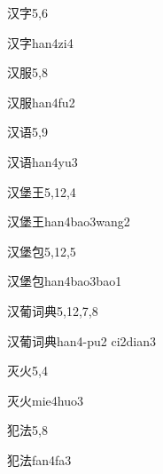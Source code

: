 \begin{entry}{汉字}{5,6}
  \begin{phonetics}{汉字}{han4zi4}
  \end{phonetics}
\end{entry}

\begin{entry}{汉服}{5,8}
  \begin{phonetics}{汉服}{han4fu2}
  \end{phonetics}
\end{entry}

\begin{entry}{汉语}{5,9}
  \begin{phonetics}{汉语}{han4yu3}
  \end{phonetics}
\end{entry}

\begin{entry}{汉堡王}{5,12,4}
  \begin{phonetics}{汉堡王}{han4bao3wang2}
  \end{phonetics}
\end{entry}

\begin{entry}{汉堡包}{5,12,5}
  \begin{phonetics}{汉堡包}{han4bao3bao1}
  \end{phonetics}
\end{entry}

\begin{entry}{汉葡词典}{5,12,7,8}
  \begin{phonetics}{汉葡词典}{han4-pu2 ci2dian3}
  \end{phonetics}
\end{entry}

\begin{entry}{灭火}{5,4}
  \begin{phonetics}{灭火}{mie4huo3}
  \end{phonetics}
\end{entry}

\begin{entry}{犯法}{5,8}
  \begin{phonetics}{犯法}{fan4fa3}
  \end{phonetics}
\end{entry}

